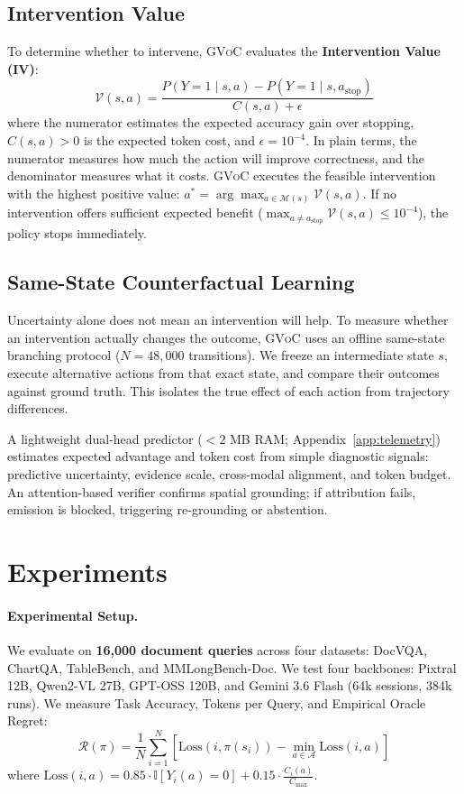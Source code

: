 \documentclass[11pt]{article}
\begin{document}
\subsection{Intervention Value}
To determine whether to intervene, \textsc{GVoC} evaluates the \textbf{Intervention Value (IV)}:
\begin{equation}
\label{eq:voc_ratio}
\mathcal{V}(s, a) = \frac{P(Y=1 \mid s, a) - P(Y=1 \mid s, a_{\text{stop}})}{C(s, a) + \epsilon}
\end{equation}
where the numerator estimates the expected accuracy gain over stopping, $C(s, a) > 0$ is the expected token cost, and $\epsilon = 10^{-4}$. In plain terms, the numerator measures how much the action will improve correctness, and the denominator measures what it costs. \textsc{GVoC} executes the feasible intervention with the highest positive value: $a^* = \arg\max_{a \in \mathcal{M}(s)} \mathcal{V}(s, a)$. If no intervention offers sufficient expected benefit ($\max_{a \neq a_{\text{stop}}} \mathcal{V}(s, a) \le 10^{-4}$), the policy stops immediately.

\subsection{Same-State Counterfactual Learning}
Uncertainty alone does not mean an intervention will help. To measure whether an intervention actually changes the outcome, \textsc{GVoC} uses an offline same-state branching protocol ($N = 48,000$ transitions). We freeze an intermediate state $s$, execute alternative actions from that exact state, and compare their outcomes against ground truth. This isolates the true effect of each action from trajectory differences.

A lightweight dual-head predictor ($<2$ MB RAM; Appendix~\ref{app:telemetry}) estimates expected advantage and token cost from simple diagnostic signals: predictive uncertainty, evidence scale, cross-modal alignment, and token budget. An attention-based verifier confirms spatial grounding; if attribution fails, emission is blocked, triggering re-grounding or abstention.

\clearpage

\section{Experiments}
\label{sec:experiments}

\paragraph{Experimental Setup.}
We evaluate on \textbf{16,000 document queries} across four datasets: DocVQA, ChartQA, TableBench, and MMLongBench-Doc. We test four backbones: Pixtral 12B, Qwen2-VL 27B, GPT-OSS 120B, and Gemini 3.6 Flash (64k sessions, 384k runs). We measure Task Accuracy, Tokens per Query, and Empirical Oracle Regret:
\begin{equation}
\label{eq:regret}
\mathcal{R}(\pi) = \frac{1}{N} \sum_{i=1}^N \left[ \text{Loss}(i, \pi(s_i)) - \min_{a \in \mathcal{A}} \text{Loss}(i, a) \right]
\end{equation}
where $\text{Loss}(i, a) = 0.85 \cdot \mathbb{I}[Y_i(a)=0] + 0.15 \cdot \frac{C_i(a)}{C_{\max}}$.
\end{document}
